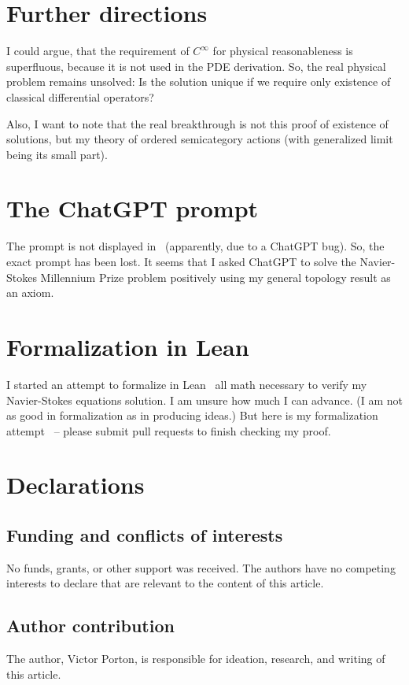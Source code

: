 \documentclass{amsart}
\begin{document}
\section{Further directions}

I could argue, that the requirement of $C^\infty$ for physical reasonableness is superfluous, because it is not used in the PDE derivation. So, the real physical problem remains unsolved: Is the solution unique if we require only existence of classical differential operators?

Also, I want to note that the real breakthrough is not this proof of existence of solutions, but my theory of ordered semicategory actions (with generalized limit being its small part).

\section{The ChatGPT prompt}

The prompt is not displayed in~\cite{navier-stokes-chat} (apparently, due to a ChatGPT bug). So, the exact prompt has been lost. It seems that I asked ChatGPT to solve the Na\-vi\-er-Sto\-kes Millennium Prize problem positively using my general topology result as an axiom.

\section{Formalization in Lean}

I started an attempt to formalize in Lean~\cite{lean} all math necessary to verify my Na\-vi\-er-Sto\-kes equations solution. I am unsure how much I can advance. (I am not as good in formalization as in producing ideas.) But here is my formalization attempt~\cite{formal-atgt} -- please submit pull requests to finish checking my proof.

\section{Declarations}

\subsection{Funding and conflicts of interests}

No funds, grants, or other support was received. The authors have no competing interests to declare that are relevant to the content of this article.

\subsection{Author contribution}

The author, Victor Porton, is responsible for ideation, research, and writing of this article.



\end{document}
